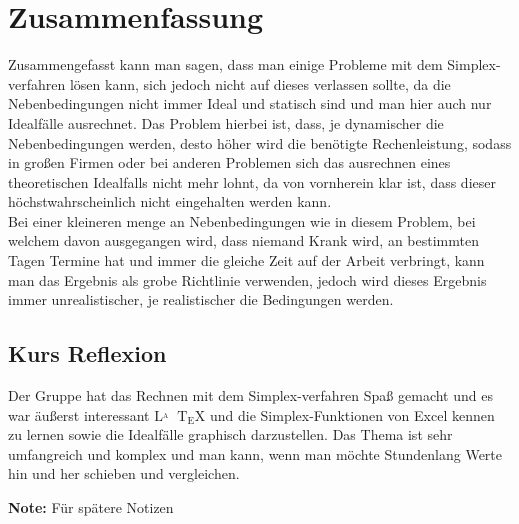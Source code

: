 \section{Zusammenfassung }

Zusammengefasst kann man sagen, dass man einige Probleme mit dem Simplex-verfahren lösen kann, sich jedoch nicht auf dieses verlassen sollte, da die Nebenbedingungen nicht immer Ideal und statisch sind und man hier auch nur Idealfälle ausrechnet. Das Problem hierbei ist, dass, je dynamischer die Nebenbedingungen werden, desto höher wird die benötigte Rechenleistung, sodass in großen Firmen oder bei anderen Problemen sich das ausrechnen eines theoretischen Idealfalls nicht mehr lohnt, da von vornherein klar ist, dass dieser höchstwahrscheinlich nicht eingehalten werden kann. \\
Bei einer kleineren menge an Nebenbedingungen wie in diesem Problem, bei welchem davon ausgegangen wird, dass niemand Krank wird, an bestimmten Tagen Termine hat und immer die gleiche Zeit auf der Arbeit verbringt, kann man das Ergebnis als grobe Richtlinie verwenden, jedoch wird dieses Ergebnis immer unrealistischer, je realistischer die Bedingungen werden.

\subsection{Kurs Reflexion}

Der Gruppe hat das Rechnen mit dem Simplex-verfahren Spaß gemacht und es war äußerst interessant ${\displaystyle \mathrm {L\!\!^{{}_{A}}\!\!\!\!\!\;\;T\!_{\displaystyle E}\!X} }$ und die Simplex-Funktionen von Excel kennen zu lernen sowie die Idealfälle graphisch darzustellen. Das Thema ist sehr umfangreich und komplex und man kann, wenn man möchte Stundenlang Werte hin und her schieben und vergleichen.

{\bf Note:} Für spätere Notizen